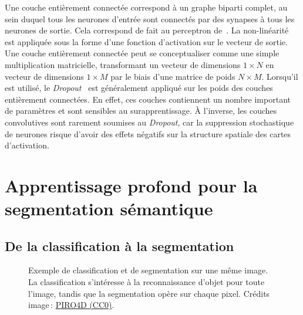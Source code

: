 Une couche entièrement connectée correspond à un graphe biparti complet, au sein duquel tous les neurones d'entrée sont connectés par des synapses à tous les neurones de sortie. Cela correspond de fait au perceptron de~\citet{rosenblatt_perceptron_1957}. La non-linéarité est appliquée sous la forme d'une fonction d'activation sur le vecteur de sortie. Une couche entièrement connectée peut se conceptualiser comme une simple multiplication matricielle, transformant un vecteur de dimensions $1\times{}N$ en vecteur de dimensions $1\times{}M$ par le biais d'une matrice de poids $N\times{}M$. Lorsqu'il est utilisé, le \emph{Dropout}~\cite{srivastava_dropout_2014} est généralement appliqué sur les poids des couches entièrement connectées. En effet, ces couches contiennent un nombre important de paramètres et sont sensibles au surapprentissage. À l'inverse, les couches convolutives sont rarement soumises au \emph{Dropout}, car la suppression stochastique de neurones risque d'avoir des effets négatifs sur la structure spatiale des cartes d'activation.

\section{Apprentissage profond pour la segmentation sémantique}

\subsection{De la classification à la segmentation}

\begin{figure}[t]
  \resizebox{\textwidth}{!}{}
  \caption{Exemple de classification et de segmentation sur une même image. La classification s'intéresse à la reconnaissance d'objet pour toute l'image, tandis que la segmentation opère sur chaque pixel. {\small Crédits image\,: \href{https://pixabay.com/en/balloon-hot-air-balloon-ride-mission-2331488/}{PIRO4D (CC0)}}.}
  \label{fig:classif_vs_seg}
\end{figure}

